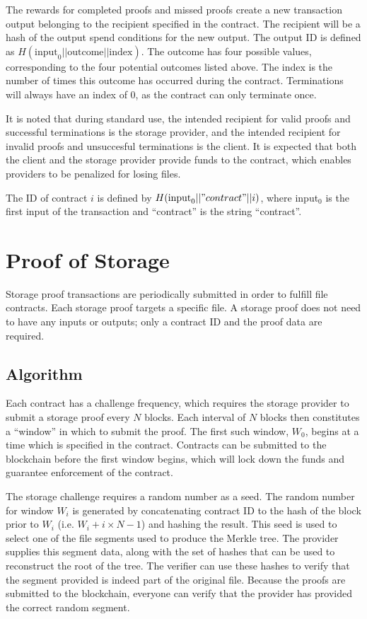 \documentclass[twocolumn]{article}
\begin{document}
The rewards for completed proofs and missed proofs create a new transaction output belonging to the recipient specified in the contract.
The recipient will be a hash of the output spend conditions for the new output.
The output ID is defined as $H(\text{input}_0 || \text{outcome} || \text{index})$.
The outcome has four possible values, corresponding to the four potential outcomes listed above.
The index is the number of times this outcome has occurred during the contract.
Terminations will always have an index of 0, as the contract can only terminate once.

It is noted that during standard use, the intended recipient for valid proofs and successful terminations is the storage provider, and the intended recipient for invalid proofs and unsuccesful terminations is the client.
It is expected that both the client and the storage provider provide funds to the contract, which enables providers to be penalized for losing files.

The ID of contract $i$ is defined by $H(\text{input}_0 || "contract" || i)$, where input$_0$ is the first input of the transaction and ``contract'' is the string ``contract''.

\section{Proof of Storage}
\label{sec:storage}
Storage proof transactions are periodically submitted in order to fulfill file contracts.
Each storage proof targets a specific file.
A storage proof does not need to have any inputs or outputs; only a contract ID and the proof data are required.

\subsection{Algorithm}
Each contract has a challenge frequency, which requires the storage provider to submit a storage proof every $N$ blocks.
Each interval of $N$ blocks then constitutes a ``window'' in which to submit the proof.
The first such window, $W_0$, begins at a time which is specified in the contract.
Contracts can be submitted to the blockchain before the first window begins, which will lock down the funds and guarantee enforcement of the contract.

The storage challenge requires a random number as a seed.
The random number for window $W_i$ is generated by concatenating contract ID to the hash of the block prior to $W_i$ (i.e. $W_i + i \times N - 1$) and hashing the result.
This seed is used to select one of the file segments used to produce the Merkle tree.
The provider supplies this segment data, along with the set of hashes that can be used to reconstruct the root of the tree.
The verifier can use these hashes to verify that the segment provided is indeed part of the original file.
Because the proofs are submitted to the blockchain, everyone can verify that the provider has provided the correct random segment.
\end{document}
